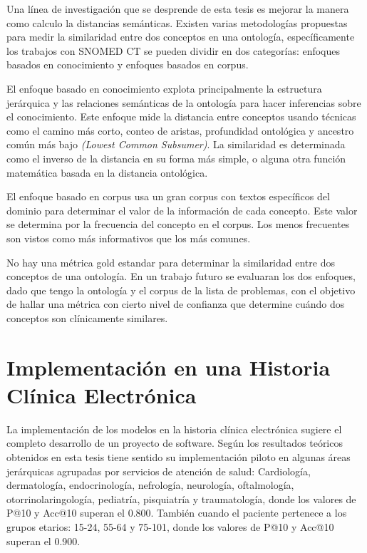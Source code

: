 Una línea de investigación que se desprende de esta tesis es mejorar la manera como calculo la distancias semánticas. Existen varias metodologías propuestas para medir la similaridad entre dos conceptos en una ontología, específicamente los trabajos con SNOMED CT se pueden dividir en dos categorías: enfoques basados en conocimiento y enfoques basados en corpus.  \cite{Mabotuwana2013,BenAouicha2016,Sanchez2011,Harispe2014}

El enfoque basado en conocimiento explota principalmente la estructura jerárquica y las relaciones semánticas de la ontología para hacer inferencias sobre el conocimiento. Este enfoque mide la distancia entre conceptos usando técnicas como el camino más corto, conteo de aristas, profundidad ontológica y ancestro común más bajo \textit{(Lowest Common Subsumer)}. La similaridad es determinada como el inverso de la distancia en su forma más simple, o alguna otra función matemática basada en la distancia ontológica.\cite{Mabotuwana2013}

El enfoque basado en corpus usa un gran corpus con textos específicos del dominio para determinar el valor de la información de cada concepto. Este valor se determina por la frecuencia del concepto en el corpus. Los menos frecuentes son vistos como más informativos que los más comunes.\cite{Mabotuwana2013}

No hay una métrica gold estandar para determinar la similaridad entre dos conceptos de una ontología. En un trabajo futuro se evaluaran los dos enfoques, dado que tengo la ontología y el corpus de la lista de problemas, con el objetivo de hallar una métrica con cierto nivel de confianza que determine cuándo dos conceptos son clínicamente similares.

\section{Implementación en una Historia Clínica Electrónica}

La implementación de los modelos en la historia clínica electrónica sugiere el completo desarrollo de un proyecto de software. Según los resultados teóricos obtenidos en esta tesis tiene sentido su implementación piloto en algunas áreas jerárquicas agrupadas por servicios de atención de salud: Cardiología, dermatología, endocrinología, nefrología, neurología, oftalmología, otorrinolaringología, pediatría, pisquiatría y traumatología, donde los valores de P@10 y Acc@10 superan el 0.800. También cuando el paciente pertenece a los grupos etarios: 15-24, 55-64 y 75-101, donde los valores de P@10 y Acc@10 superan el 0.900.

